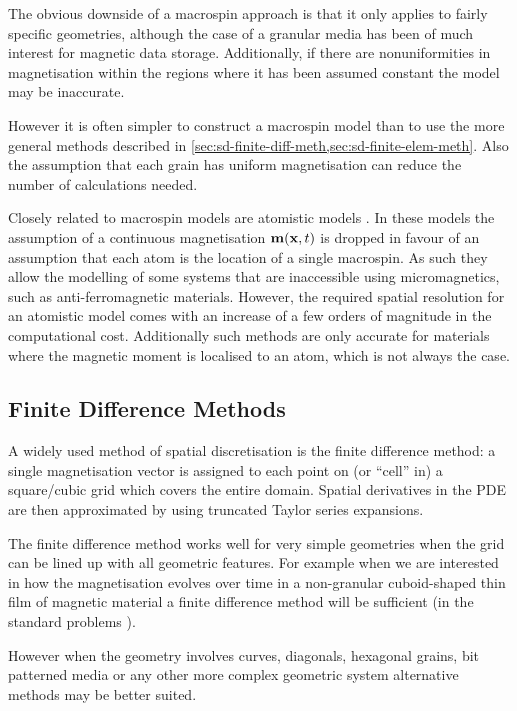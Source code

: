 The obvious downside of a macrospin approach is that it only applies to fairly specific geometries, although the case of a granular media has been of much interest for magnetic data storage.
Additionally, if there are nonuniformities in magnetisation within the regions where it has been assumed constant the model may be inaccurate.

However it is often simpler to construct a macrospin model than to use the more general methods described in \cref{sec:sd-finite-diff-meth,sec:sd-finite-elem-meth}.
Also the assumption that each grain has uniform magnetisation can reduce the number of calculations needed.

Closely related to macrospin models are atomistic models \cite{Evans2014}.
In these models the assumption of a continuous magnetisation $\boldsymbol{\mathrm{m}}(\boldsymbol{\mathrm{x}}, t)$ is dropped in favour of an assumption that each atom is the location of a single macrospin.
As such they allow the modelling of some systems that are inaccessible using micromagnetics, such as anti-ferromagnetic materials.
However, the required spatial resolution for an atomistic model comes with an increase of a few orders of magnitude in the computational cost.
Additionally such methods are only accurate for materials where the magnetic moment is localised to an atom, which is not always the case.


\subsection{Finite Difference Methods}
\label{sec:sd-finite-diff-meth}

A widely used method of spatial discretisation is the finite difference method: a single magnetisation vector is assigned to each point on (or ``cell'' in) a square/cubic grid which covers the entire domain.
Spatial derivatives in the PDE are then approximated by using truncated Taylor series expansions.

The finite difference method works well for very simple geometries when the grid can be lined up with all geometric features.
For example when we are interested in how the magnetisation evolves over time in a non-granular cuboid-shaped thin film of magnetic material a finite difference method will be sufficient (\eg in the \mumag standard problems \cite{mumag-website}).

However when the geometry involves curves, diagonals, hexagonal grains, bit patterned media or any other more complex geometric system alternative methods may be better suited.


